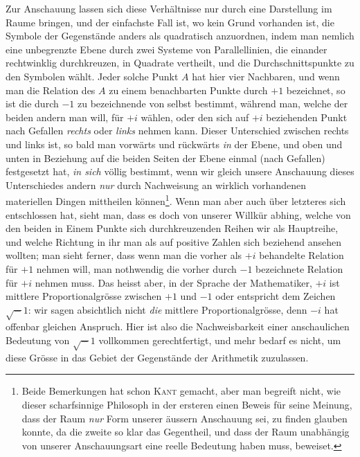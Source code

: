 Zur Anschauung lassen sich diese Verhältnisse nur durch eine Darstellung
%
im Raume bringen, und der einfachste Fall ist, wo kein Grund vorhanden ist, die Symbole der Gegenstände anders als quadratisch anzuordnen, indem man nemlich eine unbegrenzte Ebene durch zwei Systeme von Parallellinien, die einander rechtwinklig durchkreuzen, in Quadrate vertheilt, und die Durchschnittspunkte zu den Symbolen wählt. Jeder solche Punkt $A$ hat hier vier Nachbaren, und wenn man die Relation des $A$ zu einem benachbarten Punkte durch $+1$ bezeichnet, so ist die durch $-1$ zu bezeichnende von selbst bestimmt, während man, welche der beiden andern man will, für $+i$ wählen, oder den sich auf $+i$ beziehenden Punkt nach Gefallen \emph{rechts} oder \emph{links} nehmen kann. Dieser Unterschied zwischen rechts und links ist, so bald man vorwärts und rückwärts \emph{in} der Ebene, und oben und unten in Beziehung auf die beiden Seiten der Ebene einmal (nach Gefallen) festgesetzt hat, \emph{in sich} völlig bestimmt, wenn wir gleich unsere Anschauung dieses Unterschiedes andern \emph{nur} durch Nachweisung an wirklich vorhandenen materiellen Dingen mittheilen können\begingroup\renewcommand{\thefootnote}{*)}\footnote{Beide Bemerkungen hat schon \textsc{Kant} gemacht, aber man begreift nicht, wie dieser scharfsinnige Philosoph in der ersteren einen Beweis für seine Meinung, dass der Raum \emph{nur} Form unserer äussern Anschauung sei, zu finden glauben konnte, da die zweite so klar das Gegentheil, und dass der Raum unabhängig von unserer Anschauungsart eine reelle Bedeutung haben muss, beweiset.}\endgroup. Wenn man aber auch über letzteres sich entschlossen hat, sieht man, dass es doch von unserer Willkür abhing, welche von den beiden in Einem Punkte sich durchkreuzenden Reihen wir als Hauptreihe, und welche Richtung in ihr man als auf positive Zahlen sich beziehend ansehen wollten; man sieht ferner, dass wenn man die vorher als $+i$ behandelte Relation für $+1$ nehmen will, man nothwendig die vorher durch $-1$ bezeichnete Relation für $+i$ nehmen muss. Das heisst aber, in der Sprache der Mathematiker, $+i$ ist mittlere Proportionalgrösse zwischen $+1$ und $-1$ oder entspricht dem Zeichen $\surd-1$: wir sagen absichtlich nicht \emph{die} mittlere Proportionalgrösse, denn $-i$ hat offenbar gleichen Anspruch. Hier ist also die Nachweisbarkeit einer anschaulichen Bedeutung von $\surd-1$ vollkommen gerechtfertigt, und mehr bedarf es nicht, um diese Grösse in das Gebiet der Gegenstände der Arithmetik zuzulassen.

